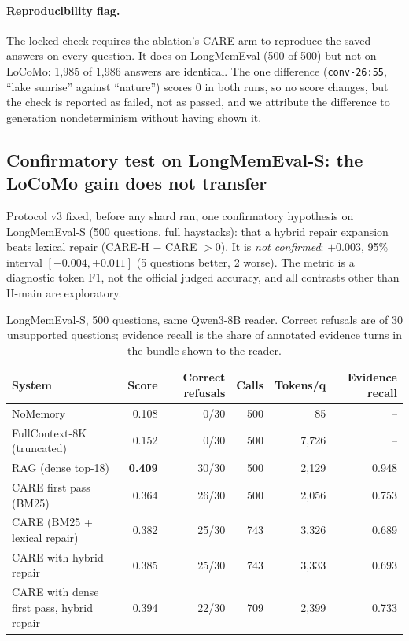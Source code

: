 \documentclass[10pt]{article}
\theoremstyle{plain}
\newcommand{\care}{\textsc{CARE}}
\begin{document}
\paragraph{Reproducibility flag.} The locked check requires the ablation's \care{} arm to reproduce the saved answers on
every question. It does on LongMemEval (500 of 500) but not on LoCoMo: 1,985 of 1,986 answers are identical. The one
difference (\texttt{conv-26:55}, ``lake sunrise'' against ``nature'') scores 0 in both runs, so no score changes, but the
check is reported as failed, not as passed, and we attribute the difference to generation nondeterminism without
having shown it.

\subsection{Confirmatory test on LongMemEval-S: the LoCoMo gain does not transfer}
\label{sec:lmes}

Protocol v3 fixed, before any shard ran, one confirmatory hypothesis on LongMemEval-S (500 questions, full haystacks):
that a hybrid repair expansion beats lexical repair (CARE-H $-$ \care{} $>0$). It is \emph{not confirmed}: $+0.003$,
95\% interval $[-0.004,+0.011]$ (5 questions better, 2 worse). The metric is a diagnostic token F1, not the official
judged accuracy, and all contrasts other than H-main are exploratory.

\begin{table}[t]
\centering
\caption{LongMemEval-S, 500 questions, same Qwen3-8B reader. Correct refusals are of 30 unsupported questions; evidence
recall is the share of annotated evidence turns in the bundle shown to the reader.}
\label{tab:lmes}
\small
\begin{tabular}{lrrrrr}
\toprule
System & Score & Correct refusals & Calls & Tokens/q & Evidence recall \\
\midrule
NoMemory & 0.108 & 0/30 & 500 & 85 & -- \\
FullContext-8K (truncated) & 0.152 & 0/30 & 500 & 7,726 & -- \\
RAG (dense top-18) & \textbf{0.409} & 30/30 & 500 & 2,129 & 0.948 \\
\care{} first pass (BM25) & 0.364 & 26/30 & 500 & 2,056 & 0.753 \\
\care{} (BM25 + lexical repair) & 0.382 & 25/30 & 743 & 3,326 & 0.689 \\
\care{} with hybrid repair & 0.385 & 25/30 & 743 & 3,333 & 0.693 \\
\care{} with dense first pass, hybrid repair & 0.394 & 22/30 & 709 & 2,399 & 0.733 \\
\bottomrule
\end{tabular}
\end{table}
\end{document}
